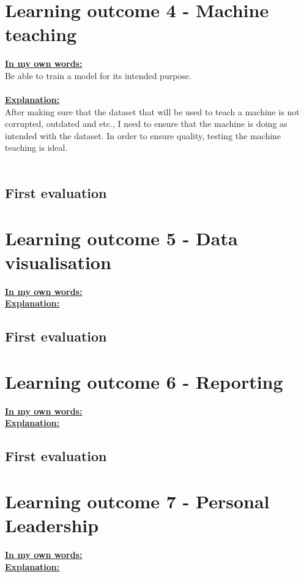 \documentclass{article}
\begin{document}
\section{Learning outcome 4 - Machine teaching}
\underline{\textbf{In my own words:}}\\
Be able to train a model for its intended purpose.\\\\
\underline{\textbf{Explanation:}}\\
After making sure that the dataset that will be used to teach a machine is not corrupted, outdated and etc., 
I need to ensure that the machine is doing as intended with the dataset. In order to ensure quality, testing the
machine teaching is ideal.\\\\
\subsection{First evaluation}

\section{Learning outcome 5 - Data visualisation}
\underline{\textbf{In my own words:}}\\

\underline{\textbf{Explanation:}}\\
\subsection{First evaluation}

\section{Learning outcome 6 - Reporting}
\underline{\textbf{In my own words:}}\\
\underline{\textbf{Explanation:}}\\
\subsection{First evaluation}

\section{Learning outcome 7 - Personal Leadership}
\underline{\textbf{In my own words:}}\\
\underline{\textbf{Explanation:}}\\
\end{document}
